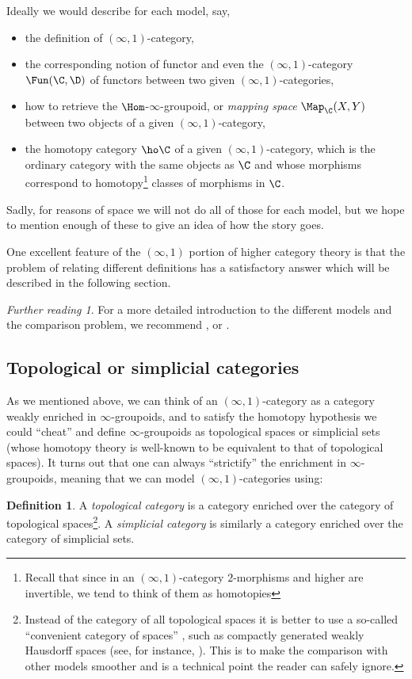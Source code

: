 \documentclass[12pt]{amsart}
\theoremstyle{definition} \newtheorem{definition}[theorem]{Definition}
\theoremstyle{remark} \newtheorem{remark}[theorem]{Remark}
\newtheorem*{further}{Further reading}
\numberwithin{equation}{section}
\newcommand{\oo}{\infty}
\newcommand{\io}{$(\oo,1)$}
\begin{document}
Ideally we would describe for each model, say, \begin{itemize} \item
the definition of \io-category, \item the corresponding notion of
functor and even the \io-category $\Fun(\C,\D)$ of functors between
two given \io-categories, \item how to retrieve the
$\Hom$-$\oo$-groupoid, or \emph{mapping space} $\Map_\C(X,Y)$ between
two objects of a given \io-category, \item the homotopy category $\ho
\C$ of a given \io-category, which is the ordinary category with the
same objects as $\C$ and whose morphisms correspond to
homotopy\footnote{Recall that since in an \io-category $2$-morphisms
and higher are invertible, we tend to think of them as homotopies}
classes of morphisms in $\C$. \end{itemize}

Sadly, for reasons of space we will not do all of those for each
model, but we hope to mention enough of these to give an idea of how
the story goes.

One excellent feature of the \io{} portion of higher category theory
is that the problem of relating different definitions has a
satisfactory answer which will be described in the following section.

\begin{further} For a more detailed introduction to the different
models and the comparison problem, we recommend \cite{BergnerSurvey},
\cite{JoyalTierney} or \cite{Porter}. \end{further}

\subsection{Topological or simplicial categories}

As we mentioned above, we can think of an \io-category as a category
weakly enriched in $\oo$-groupoids, and to satisfy the homotopy
hypothesis we could ``cheat'' and define $\oo$-groupoids as
topological spaces or simplicial sets (whose homotopy theory is
well-known to be equivalent to that of topological spaces). It turns
out that one can always ``strictify'' the enrichment in
$\oo$-groupoids, meaning that we can model \io-categories using:

\begin{definition} A \emph{topological category} is a category
enriched over the category of topological spaces\footnote{Instead of
the category of all topological spaces it is better to use a so-called
``convenient category of spaces'' \cite{Steenrod}, such as compactly
generated weakly Hausdorff spaces (see, for instance,
\cite{Strickland}). This is to make the comparison with other models
smoother and is a technical point the reader can safely ignore.}. A
\emph{simplicial category} is similarly a category enriched over the
category of simplicial sets. \end{definition}
\end{document}
